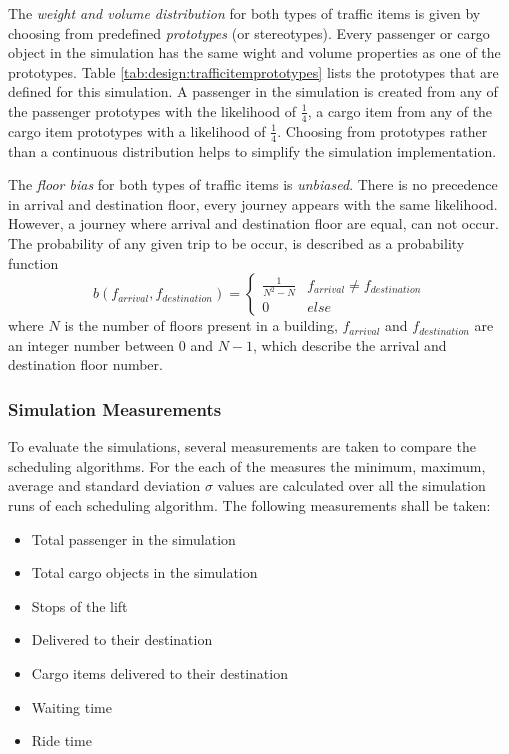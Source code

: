 The \emph{weight and volume distribution} for both types of traffic items is given by choosing from predefined \emph{prototypes} (or stereotypes).
Every passenger or cargo object in the simulation has the same wight and volume properties as one of the prototypes.
Table \ref{tab:design:trafficitemprototypes} lists the prototypes that are defined for this simulation.
A passenger in the simulation is created from any of the passenger prototypes with the likelihood of $ \frac{1}{4} $, a cargo item from any of the cargo item prototypes with a likelihood of $ \frac{1}{4} $.
Choosing from prototypes rather than a continuous distribution helps to simplify the simulation implementation.

The \emph{floor bias} for both types of traffic items is \emph{unbiased}. 
There is no precedence in arrival and destination floor, every journey appears with the same likelihood.
However, a journey where arrival and destination floor are equal, can not occur.
The probability of any given trip to be occur, is described as a probability function
$$ b(f_{arrival}, f_{destination}) =
    \begin{cases} 
      \frac{1}{N^2 - N} & f_{arrival} \neq f_{destination} \\
      0 & else
   \end{cases}
$$
where $ N $ is the number of floors present in a building, $ f_{arrival} $ and  $ f_{destination} $ are an integer number between 0 and $ N - 1$, which describe the arrival and destination floor number.

\subsubsection{Simulation Measurements}
To evaluate the simulations, several measurements are taken to compare the scheduling algorithms.
For the each of the measures the minimum, maximum, average and standard deviation $ \sigma{} $ values are calculated over all the simulation runs of each scheduling algorithm.  
The following measurements shall be taken:
\begin{samepage}
\begin{itemize}
    \item Total passenger in the simulation
    \item Total cargo objects in the simulation
    \item Stops of the lift
    \item Delivered to their destination
    \item Cargo items delivered to their destination
    \item Waiting time
    \item Ride time
\end{itemize}
\end{samepage}
 



